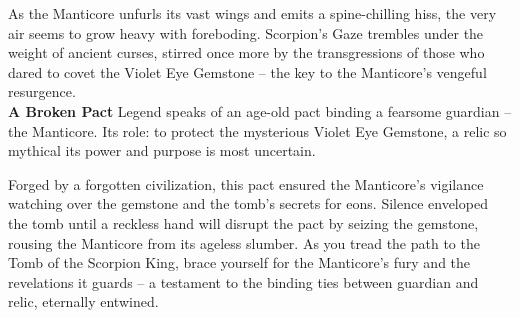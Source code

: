As the Manticore unfurls its vast wings and emits a spine-chilling hiss, the very air seems to grow heavy with foreboding. Scorpion's Gaze trembles under the weight of ancient curses, stirred once more by the transgressions of those who dared to covet the Violet Eye Gemstone – the key to the Manticore's vengeful resurgence.\\

\textbf{A Broken Pact} Legend speaks of an age-old pact binding a fearsome guardian – the Manticore. Its role: to protect the mysterious Violet Eye Gemstone, a relic so mythical its power and purpose is most uncertain.

Forged by a forgotten civilization, this pact ensured the Manticore's vigilance watching over the gemstone and the tomb's secrets for eons. Silence enveloped the tomb until a reckless hand will disrupt the pact by seizing the gemstone, rousing the Manticore from its ageless slumber.
\vfill\eject\vspace*{0.25\fontdimen6\font}
As you tread the path to the Tomb of the Scorpion King, brace yourself for the Manticore's fury and the revelations it guards – a testament to the binding ties between guardian and relic, eternally entwined.

